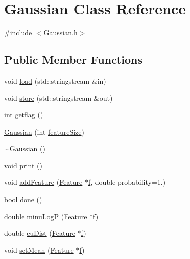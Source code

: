 \hypertarget{class_gaussian}{\section{Gaussian Class Reference}
\label{class_gaussian}
}


{\ttfamily \#include $<$Gaussian.\+h$>$}

\subsection*{Public Member Functions}
\begin{DoxyCompactItemize}
\item 
void \hyperlink{class_gaussian_acab57dfe3b371a5ca53253b16807b475}{load} (std\+::stringstream \&in)
\item 
void \hyperlink{class_gaussian_a12fcb8da10214eb54ff99d2ddbd99c9e}{store} (std\+::stringstream \&out)
\item 
int \hyperlink{class_gaussian_a33e77b127892a0dae4a864be6f5cce26}{getflag} ()
\item 
\hyperlink{class_gaussian_a60a10f6866a49764c6878b437b3572ef}{Gaussian} (int \hyperlink{class_gaussian_a63ce4e0586107dc417039d7c27233e51}{feature\+Size})
\item 
\hyperlink{class_gaussian_acf8cb96837ea65021e973a735260be5f}{$\sim$\+Gaussian} ()
\item 
void \hyperlink{class_gaussian_a1d4d9e84445d7a2a2e7edb0f2e21272c}{print} ()
\item 
void \hyperlink{class_gaussian_afebf0eac0f77d70a77f7e81c5e268d86}{add\+Feature} (\hyperlink{class_feature}{Feature} $\ast$\hyperlink{mel2hz_8m_a09113e60f6e326656763bae1603c0eb5}{f}, double probability=1.)
\item 
bool \hyperlink{class_gaussian_aec53f9ac98469f834df76ebfa2031050}{done} ()
\item 
double \hyperlink{class_gaussian_a00643bc7bb15720d270e223054e7cc48}{minu\+Log\+P} (\hyperlink{class_feature}{Feature} $\ast$\hyperlink{mel2hz_8m_a09113e60f6e326656763bae1603c0eb5}{f})
\item 
double \hyperlink{class_gaussian_a7bb91c9ad1d8a6c0bf0f70e034743890}{eu\+Dist} (\hyperlink{class_feature}{Feature} $\ast$\hyperlink{mel2hz_8m_a09113e60f6e326656763bae1603c0eb5}{f})
\item 
void \hyperlink{class_gaussian_ad8a9bb8df0e9baf25c4fc7501e8e8d61}{set\+Mean} (\hyperlink{class_feature}{Feature} $\ast$\hyperlink{mel2hz_8m_a09113e60f6e326656763bae1603c0eb5}{f})
\item 

\end{DoxyCompactItemize}
